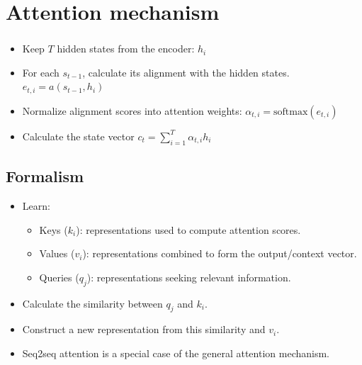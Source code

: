 \documentclass[xcolor=table]{beamer}
\begin{document}
	\section{Attention mechanism}
	
	\begin{frame}
		\frametitle{\insertshortsubtitle}
		\framesubtitle{\insertsection}
		
		\begin{center}
		\end{center}
		
		\vskip-6pt
		\begin{itemize}
			\item Keep $T$ hidden states from the encoder: $h_i$
			\item For each $s_{t-1}$, calculate its alignment with the hidden states.
			$ e_{t, i} = a(s_{t-1}, h_i) $
			\item Normalize alignment scores into attention weights: $\alpha_{t, i} = \text{softmax}(e_{t, i})$
			\item Calculate the state vector $c_t = \sum_{i=1}^{T} \alpha_{t, i} h_i$
		\end{itemize}
		
	\end{frame}
	
	\subsection{Formalism}
	
	\begin{subsectionframe}
		\begin{itemize}
			\item Learn:
			\begin{itemize}
				\item Keys ($k_i$): representations used to compute attention scores.
				\item Values ($v_i$): representations combined to form the output/context vector.
				\item Queries ($q_j$): representations seeking relevant information.
			\end{itemize}
			\item Calculate the similarity between $q_j$ and $k_i$.
			\item Construct a new representation from this similarity and $v_i$.
			\item Seq2seq attention is a special case of the general attention mechanism.
		\end{itemize}
	\end{subsectionframe}
	
\end{document}

